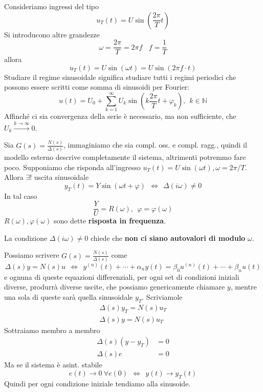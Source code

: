 Consideriamo ingressi del tipo
\begin{equation*}
	u_T(t) =U\sin\left(\frac{2\pi }{T} t\right)
\end{equation*}
Si introducono altre grandezze
\begin{equation*}
	\omega =\frac{2\pi }{T} =2\pi f\ \ \ \ f=\frac{1}{T}
\end{equation*}
allora
\begin{equation*}
	u_T(t) =U\sin(\omega t) =U\sin(2\pi f\cdotp t)
\end{equation*}
Studiare il regime sinusoidale significa studiare tutti i regimi periodici che possono essere scritti come somma di sinusoidi per Fourier:
\begin{equation*}
	u(t) =U_0 +\sum\limits ^{\infty }_{k=1} U_k\sin\left(k\frac{2\pi }{T} t+\varphi _k\right) ,\ \ k\in \mathbb{N}
\end{equation*}
Affinché ci sia convergenza della serie è necessario, ma non sufficiente, che $U_k\xrightarrow{k\to \infty } 0$.
\begin{thm}
	Sia $G(s) =\frac{N(s)}{\Delta (s)}$, immaginiamo che sia compl. oss. e compl. ragg., quindi il modello esterno descrive completamente il sistema, altrimenti potremmo fare poco. Supponiamo che risponda all'ingresso $u_T(t) =U\sin(\omega t) ,\omega =2\pi /T$. Allora $\exists !$ uscita sinusoidale
	\begin{equation*}
		y_T(t) =Y\sin(\omega t+\varphi) \ \ \iff \ \ \Delta (i\omega) \neq 0
	\end{equation*}
	In tal caso
	\begin{equation*}
		\frac{Y}{U} =R(\omega) ,\ \ \varphi =\varphi (\omega)
	\end{equation*}
	$R(\omega) ,\varphi (\omega)$ sono dette \textbf{risposta in frequenza}.
\end{thm}
La condizione $\Delta (i\omega) \neq 0$ chiede che \textbf{non ci siano autovalori di modulo} $\omega $.

Possiamo scrivere $G(s) =\frac{N(s)}{\Delta (s)}$ come
\begin{equation*}
	\Delta (s) y=N(s) u\ \ \iff \ \ y^{(n)}(t) +\cdots +\alpha _n y(t) =\beta _0 u^{(n)}(t) +\cdots +\beta _n u(t)
\end{equation*}
e ognuna di queste equazioni differenziali, per ogni set di condizioni iniziali diverse, produrrà diverse uscite, che possiamo genericamente chiamare $y$, mentre una sola di queste sarà quella sinusoidale $y_T$. Scriviamole
\begin{gather*}
	\Delta (s) y_T =N(s) u_T\\
	\Delta (s) y=N(s) u_T
\end{gather*}
Sottraiamo membro a membro
\begin{equation*}
	\begin{aligned}
		\Delta (s)(y-y_T) & =0 \\
		\Delta (s) e      & =0 
	\end{aligned}
\end{equation*}
Ma se il sistema è asint. stabile
\begin{equation*}
	e(t)\to 0\ \forall e(0) \ \ \iff \ \ y(t)\to y_T(t)
\end{equation*}
Quindi per ogni condizione iniziale tendiamo alla sinusoide.

